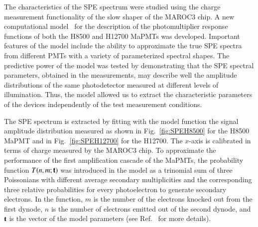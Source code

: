 \documentclass[5p,times,twocolumn]{elsarticle}
\begin{document}
The characteristics of the SPE spectrum were studied using the charge measurement functionality of the slow shaper
of the MAROC3 chip. A new computational model~\cite{Pavel} for the description of the photomultiplier response
functions of both the H8500 and H12700 MaPMTs was developed. Important features of the model include the ability
to approximate the true SPE spectra from different PMTs with a variety of
parameterized spectral shapes.
The predictive power of the model was tested by demonstrating that the SPE spectral parameters, obtained in the
measurements, may describe well the amplitude distributions of the same photodetector measured at different levels
of illumination. Thus, the model allowed us to extract the characteristic parameters of the devices independently of the test measurement conditions.

The SPE spectrum is extracted by fitting with the model function the signal amplitude distribution measured 
as shown in Fig.~\ref{fig:SPEH8500} for the H8500 MaPMT and in Fig.~\ref{fig:SPEH12700} for the H12700.
The $x$-axis is calibrated in terms of charge measured by the MAROC3 chip.
To approximate the performance of the first amplification cascade of the MaPMTs, the probability function
$T(n,m;{\bf t})$ was introduced in the model as a trinomial sum of three Poissonians with different average secondary
multiplicities and the corresponding three relative probabilities for every photoelectron to generate secondary
electrons. In the function, $m$ is the number of the electrons knocked out from the first dynode, $n$ is the number
of electrons emitted out of the second dynode, and ${\bf t}$ is the vector of the model parameters
(see Ref.~\cite{Pavel} for more details).
\end{document}
